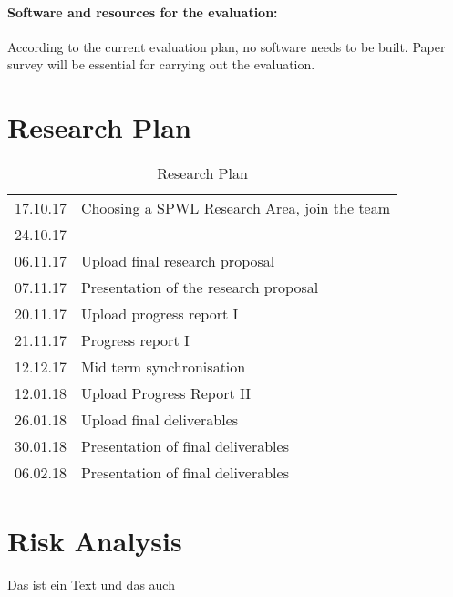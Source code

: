 \documentclass[sigchi-a, authorversion]{acmart}
\begin{document}
\paragraph{Software and resources for the evaluation:}
According to the current evaluation plan, no software needs to be built. Paper survey will be essential for carrying out the evaluation.

\section{Research Plan} %
\begin{table}[H]
  \caption{Research Plan}
  \label{tab:researchPlan}
  \begin{tabular}{ll}
    \toprule
    17.10.17 & Choosing a SPWL Research Area, join the team \\
    24.10.17 & \\
    06.11.17 & Upload final research proposal \\
    07.11.17 & Presentation of the research proposal \\
    20.11.17 & Upload progress report I \\
    21.11.17 & Progress report I \\
    12.12.17 & Mid term synchronisation \\
    12.01.18 & Upload Progress Report II \\
    26.01.18 & Upload final deliverables \\
    30.01.18 & Presentation of final deliverables \\
    06.02.18 & Presentation of final deliverables \\
    \bottomrule
  \end{tabular}
\end{table}

\section{Risk Analysis} %
Das ist ein Text \cite{DBLP:conf/conext/ValanciusLMDR09} und das auch \cite{DBLP:journals/sigmetrics/JalaliAVHAT14}



\end{document}
